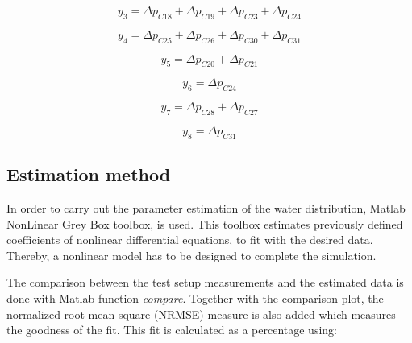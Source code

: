 \vspace{4mm}
\begin {equation}
    y_3 = \Delta p_{C18} + \Delta p_{C19} + \Delta p_{C23} + \Delta p_{C24} 
\end{equation}

\vspace{4mm}
\begin {equation}
    y_4 = \Delta p_{C25} + \Delta p_{C26} + \Delta p_{C30} + \Delta p_{C31}  
\end{equation}

\vspace{4mm}
\begin {equation}
    y_5 = \Delta p_{C20} + \Delta p_{C21}
\end{equation}

\vspace{4mm}
\begin {equation}
    y_6 = \Delta p_{C24} 
\end{equation}

\vspace{4mm}
\begin {equation}
   y_7 = \Delta p_{C28} + \Delta p_{C27}
\end{equation}

\vspace{4mm}
\begin {equation}
   y_8 = \Delta p_{C31} 
\end{equation}

 
\subsection{Estimation method} 
\label{MatlabScript}

In order to carry out the parameter estimation of the water distribution, Matlab NonLinear Grey Box toolbox\cite{MatlabGreyBox}, is used. This toolbox 
estimates previously defined coefficients of nonlinear differential equations, to fit with the desired data. 
Thereby, a nonlinear model has to be designed to complete the simulation. 

The comparison between the test setup measurements and the estimated data is done with Matlab function \textit{compare}. Together with the comparison 
plot, the normalized root mean square (NRMSE) measure is also added which measures the goodness of the fit. This fit is calculated as a percentage \cite{MatlabFit} using:


